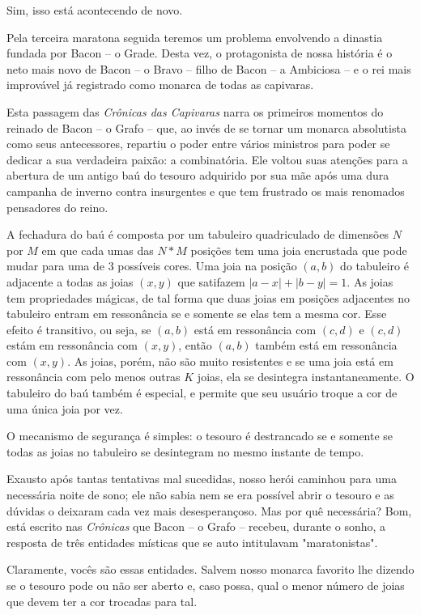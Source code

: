 Sim, isso está acontecendo de novo.

Pela terceira maratona seguida teremos um problema envolvendo a dinastia fundada por Bacon -- o Grade.
Desta vez, o protagonista de nossa história é o neto mais novo de Bacon -- o Bravo -- filho de Bacon -- a Ambiciosa -- e o rei mais improvável já registrado como monarca de todas as capivaras.

Esta passagem das \textit{Crônicas das Capivaras} narra os primeiros momentos do reinado de Bacon -- o Grafo -- que, ao invés de se tornar um monarca absolutista como seus antecessores, repartiu o poder entre vários ministros para poder se dedicar a sua verdadeira paixão: a combinatória.
Ele voltou suas atenções para a abertura de um antigo baú do tesouro adquirido por sua mãe após uma dura campanha de inverno contra insurgentes e que tem frustrado os mais renomados pensadores do reino.

A fechadura do baú é composta por um tabuleiro quadriculado de dimensões $N$ por $M$ em que cada umas das $N*M$ posições tem uma joia encrustada que pode mudar para uma de $3$ possíveis cores.
Uma joia na posição $(a,b)$ do tabuleiro é adjacente a todas as joias $(x,y)$ que satifazem $|a - x| + |b - y| = 1$.
As joias tem propriedades mágicas, de tal forma que duas joias em posições adjacentes no tabuleiro entram em ressonância se e somente se elas tem a mesma cor.
Esse efeito é transitivo, ou seja, se $(a,b)$ está em ressonância com $(c,d)$ e $(c,d)$ estám em ressonância com $(x,y)$, então $(a,b)$ também está em ressonância com $(x,y)$.
As joias, porém, não são muito resistentes e se uma joia está em ressonância com pelo menos outras $K$ joias, ela se desintegra instantaneamente.
O tabuleiro do baú também é especial, e permite que seu usuário troque a cor de uma única joia por vez.

O mecanismo de segurança é simples: o tesouro é destrancado se e somente se todas as joias no tabuleiro se desintegram no mesmo instante de tempo.

Exausto após tantas tentativas mal sucedidas, nosso herói caminhou para uma necessária noite de sono; ele não sabia nem se era possível abrir o tesouro e as dúvidas o deixaram cada vez mais desesperançoso.
Mas por quê necessária?
Bom, está escrito nas \textit{Crônicas} que Bacon -- o Grafo -- recebeu, durante o sonho, a resposta de três entidades místicas que se auto intitulavam "maratonistas".

Claramente, vocês são essas entidades. Salvem nosso monarca favorito lhe dizendo se o tesouro pode ou não ser aberto e, caso possa, qual o menor número de joias que devem ter a cor trocadas para tal.


